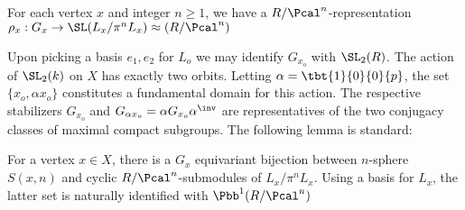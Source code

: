 \documentclass{amsart}
\begin{document}

For each vertex $x$ and integer $n\geq 1$, we have a $R/\Pcal^{n}$-representation $\rho_{x} : G_{x} \to \SL(L_x / \pi^{n} L_{x}) \approx (R / \Pcal^{n})$

Upon picking a basis $e_{1},e_{2}$ for $L_{o}$ we may identify $G_{x_{o}}$ with $\SL_{2}(R)$. The action of $\SL_{2}(k)$ on $X$ has exactly two orbits. Letting $\alpha = \tbt{1}{0}{0}{p}$, the set $\{x_{o}, \alpha x_{o}\}$ constitutes a fundamental domain for this action. The respective stabilizers $G_{x_{o}}$ and $G_{\alpha x_{o}} = \alpha G_{x_{o}} \alpha^{\inv }$ are representatives of the two conjugacy classes of maximal compact subgroups.
The following lemma is standard:
\begin{lemma}\label{lem:nball}
	For a vertex $x \in X$, there is a $G_{x}$ equivariant bijection between $n$-sphere $S(x,n)$ and cyclic $R/\Pcal^{n}$-submodules of $L_{x} / \pi^{n} L_{x}$. Using a basis for $L_{x}$, the latter set is naturally identified with $\Pbb^{1}(R/\Pcal^{n})$
\end{lemma}
\end{document}
